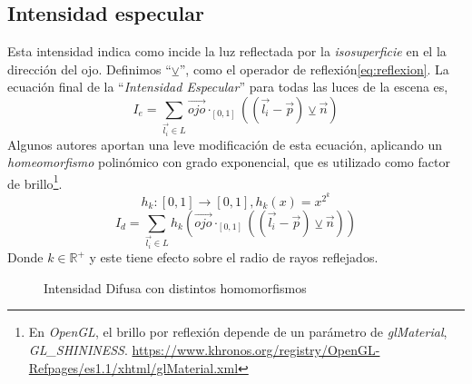 \subsection{Intensidad especular}
Esta intensidad indica como incide la luz reflectada  por la \textit{isosuperficie} en el la dirección del ojo. Definimos \enquote{\(\veebar\)}, como el operador de reflexión\ref{eq:reflexion}. La ecuación final de la \enquote{\textit{Intensidad Especular}} para todas las luces de la escena es,
\[I_e = \sum_{\Vec{l_i}\in L} \Vec{ojo}\cdot_{[0, 1]}\left(\left(\Vec{l_i}-\Vec{p}\right) \veebar \Vec{n}\right)\]
Algunos autores aportan una leve modificación de esta ecuación, aplicando un \textit{homeomorfismo} polinómico con grado exponencial, que es utilizado como factor de brillo\footnote{En \textit{OpenGL}, el brillo por reflexión depende de un parámetro de  \textit{glMaterial}, \textit{GL\_SHININESS}. \url{https://www.khronos.org/registry/OpenGL-Refpages/es1.1/xhtml/glMaterial.xml}}.
\[h_k:[0,1]\longrightarrow[0,1] , h_k(x)=x^{2^k}\]
\[I_d = \sum_{\Vec{l_i}\in L} h_k\left(\Vec{ojo}\cdot_{[0, 1]}\left(\left(\Vec{l_i}-\Vec{p}\right) \veebar \Vec{n}\right)\right)\]
Donde \(k\in\mathbb{R}^{+}\) y este tiene efecto sobre el radio de rayos reflejados.
\begin{figure}[H]
  \centering
  \captionsetup{justification=centering}%
  \hfill
  \hfill
  \caption{Intensidad Difusa con distintos homomorfismos}
\end{figure}
